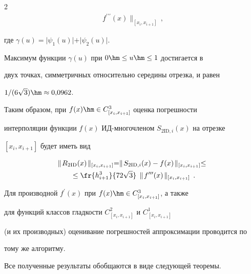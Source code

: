 \begin{multicols}{2}
\begin{multline*}
f^{\prime\prime\prime}(x)\parallel_{[x_i,x_{i+1}]}\,,


\end{multline*}


где $\gamma(u) = 


\vert \psi_1(u)\vert +\vert \psi_2(u)\vert.$





  


  Максимум функции $\gamma(u)$ при $0\hm\leq u\hm\leq 1$ достигается в 


двух точках, симметричных относительно середины отрезка, и равен 


$1/(6\sqrt{3})\hm\approx 0{,}0962$.


  


  Таким образом, при $f(x)\hm\in C^3_{[x_i, x_{i+1}]}$ оценка погрешности 


интерполяции функции $f(x)$ ИД-мно\-го\-чле\-ном $S_{2\mathrm{ID},i}(x)$ на отрезке 


$[x_i, x_{i+1}]$ будет иметь вид


  \begin{multline*}


  \parallel \!R_{2\mathrm{ID}}(x)\!\parallel_{[x_i,x_{i+1}]} = \parallel \!S_{2\mathrm{ID},i}(x) -


f(x)\!\parallel_{[x_i,x_{i+1}]} \leq {}\\


{}\leq\fr{h^3_{i+1}}{72\sqrt{3}}\,\parallel  \!


f^{\prime\prime\prime} (x)\!\parallel_{[x_i, x_{i+1}]}\,.


  \end{multline*}


  


  Для производной $f^\prime(x)$ при $f(x)\hm\in C^3_{[x_i,x_{i+1}]}$, а также 


для функций классов гладкости $C^2_{[x_i,x_{i+1}]}$ и $C^1_{[x_i,x_{i+1}]}$ 


(и их производных) оценивание погрешностей аппроксимации проводится по 


тому же алгоритму.


  


  Все полученные результаты обобщаются в виде следующей теоремы.


  



\end{multicols}
